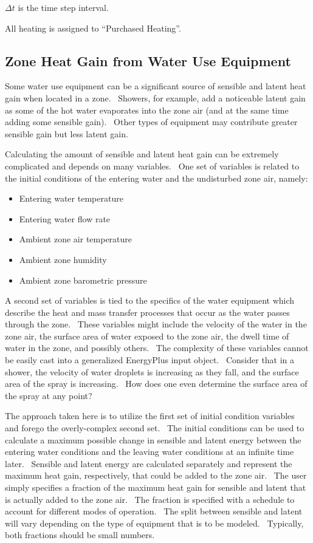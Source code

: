 \(\Delta t\) is the time step interval.

All heating is assigned to ``Purchased Heating''.

\subsection{Zone Heat Gain from Water Use Equipment}\label{zone-heat-gain-from-water-use-equipment}

Some water use equipment can be a significant source of sensible and latent heat gain when located in a zone.~ Showers, for example, add a noticeable latent gain as some of the hot water evaporates into the zone air (and at the same time adding some sensible gain).~ Other types of equipment may contribute greater sensible gain but less latent gain.

Calculating the amount of sensible and latent heat gain can be extremely complicated and depends on many variables.~ One set of variables is related to the initial conditions of the entering water and the undisturbed zone air, namely:

\begin{itemize}
\item
  Entering water temperature
\item
  Entering water flow rate
\item
  Ambient zone air temperature
\item
  Ambient zone humidity
\item
  Ambient zone barometric pressure
\end{itemize}

A second set of variables is tied to the specifics of the water equipment which describe the heat and mass transfer processes that occur as the water passes through the zone.~ These variables might include the velocity of the water in the zone air, the surface area of water exposed to the zone air, the dwell time of water in the zone, and possibly others.~ The complexity of these variables cannot be easily cast into a generalized EnergyPlus input object.~ Consider that in a shower, the velocity of water droplets is increasing as they fall, and the surface area of the spray is increasing.~ How does one even determine the surface area of the spray at any point?

The approach taken here is to utilize the first set of initial condition variables and forego the overly-complex second set.~ The initial conditions can be used to calculate a maximum possible change in sensible and latent energy between the entering water conditions and the leaving water conditions at an infinite time later.~ Sensible and latent energy are calculated separately and represent the maximum heat gain, respectively, that could be added to the zone air.~ The user simply specifies a fraction of the maximum heat gain for sensible and latent that is actually added to the zone air.~ The fraction is specified with a schedule to account for different modes of operation.~ The split between sensible and latent will vary depending on the type of equipment that is to be modeled.~ Typically, both fractions should be small numbers.

